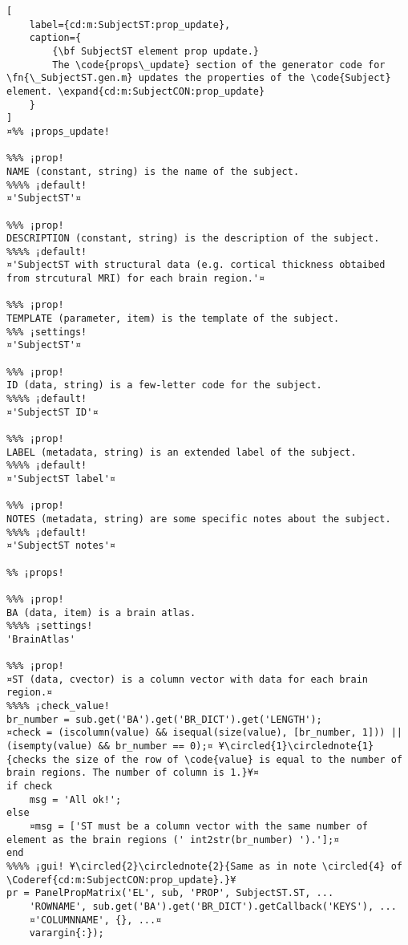 \documentclass{tufte-handout}
\begin{document}
\begin{lstlisting}[
	label={cd:m:SubjectST:prop_update},
	caption={
		{\bf SubjectST element prop update.}
		The \code{props\_update} section of the generator code for \fn{\_SubjectST.gen.m} updates the properties of the \code{Subject} element. \expand{cd:m:SubjectCON:prop_update}
	}
]
¤%% ¡props_update!

%%% ¡prop!
NAME (constant, string) is the name of the subject.
%%%% ¡default!
¤'SubjectST'¤

%%% ¡prop!
DESCRIPTION (constant, string) is the description of the subject.
%%%% ¡default!
¤'SubjectST with structural data (e.g. cortical thickness obtaibed from strcutural MRI) for each brain region.'¤

%%% ¡prop!
TEMPLATE (parameter, item) is the template of the subject.
%%% ¡settings!
¤'SubjectST'¤

%%% ¡prop!
ID (data, string) is a few-letter code for the subject.
%%%% ¡default!
¤'SubjectST ID'¤

%%% ¡prop!
LABEL (metadata, string) is an extended label of the subject.
%%%% ¡default!
¤'SubjectST label'¤

%%% ¡prop!
NOTES (metadata, string) are some specific notes about the subject.
%%%% ¡default!
¤'SubjectST notes'¤

%% ¡props!

%%% ¡prop!
BA (data, item) is a brain atlas.
%%%% ¡settings!
'BrainAtlas'

%%% ¡prop!
¤ST (data, cvector) is a column vector with data for each brain region.¤
%%%% ¡check_value!
br_number = sub.get('BA').get('BR_DICT').get('LENGTH');
¤check = (iscolumn(value) && isequal(size(value), [br_number, 1])) || (isempty(value) && br_number == 0);¤ ¥\circled{1}\circlednote{1}{checks the size of the row of \code{value} is equal to the number of brain regions. The number of column is 1.}¥¤
if check
    msg = 'All ok!';
else   
    ¤msg = ['ST must be a column vector with the same number of element as the brain regions (' int2str(br_number) ').'];¤
end
%%%% ¡gui! ¥\circled{2}\circlednote{2}{Same as in note \circled{4} of \Coderef{cd:m:SubjectCON:prop_update}.}¥
pr = PanelPropMatrix('EL', sub, 'PROP', SubjectST.ST, ...
    'ROWNAME', sub.get('BA').get('BR_DICT').getCallback('KEYS'), ...
    ¤'COLUMNNAME', {}, ...¤
    varargin{:});
\end{lstlisting}
\clearpage
\end{document}
